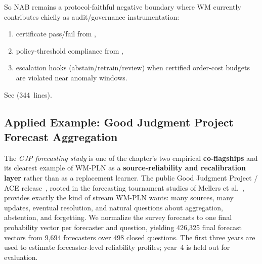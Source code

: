 \documentclass[11pt,openany]{report}
\begin{document}
So NAB remains a protocol-faithful negative boundary where WM currently
contributes chiefly as audit/governance instrumentation:
\begin{enumerate}
\item certificate pass/fail from
  ,
\item policy-threshold compliance from
  ,
\item escalation hooks (abstain/retrain/review) when certified order-cost
  budgets are violated near anomaly windows.
\end{enumerate}

See  (344~lines).

\subsection{Applied Example: Good Judgment Project Forecast Aggregation}

The \emph{GJP forecasting study} is one of the chapter's two empirical
\textbf{co-flagships} and its clearest example of WM-PLN as a
\textbf{source-reliability and recalibration layer} rather than as a
replacement learner.  The public Good Judgment Project / ACE
release~\cite{IARPA2024GJPData}, rooted in the forecasting tournament
studies of Mellers et al.~\cite{Mellers2014PsychologicalStrategies},
provides exactly the kind of stream WM-PLN wants: many sources, many
updates, eventual resolution, and natural questions about aggregation,
abstention, and forgetting.  We normalize the survey forecasts to one
final probability vector per forecaster and question, yielding
426{,}325 final forecast vectors from 9{,}694 forecasters over 498
closed questions.  The first three years are used to estimate
forecaster-level reliability profiles; year~4 is held out for
evaluation.

\begin{center}
\end{center}
\end{document}
